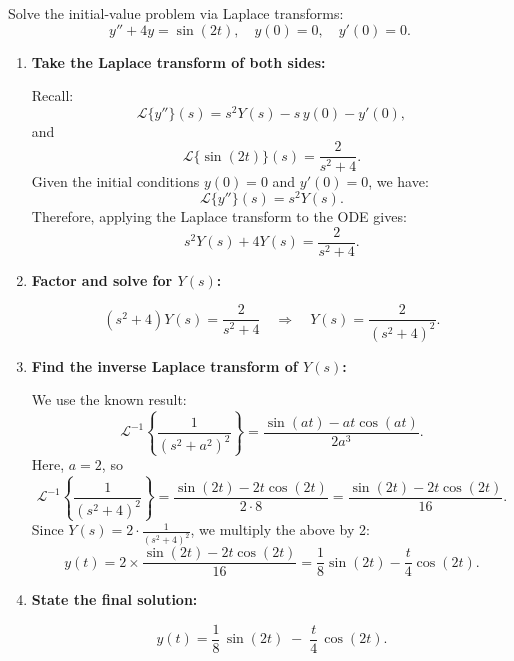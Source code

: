 \exampleline
\begin{example}
Solve the initial-value problem via Laplace transforms:
\[
y'' + 4y = \sin(2t), 
\quad y(0) = 0, 
\quad y'(0) = 0.
\]

\begin{solution}
\begin{enumerate}
\item \textbf{Take the Laplace transform of both sides:}

   Recall:
   \[
   \mathcal{L}\{y''\}(s) 
   = s^2Y(s) - s\,y(0) - y'(0), 
   \]
   and
   \[
   \mathcal{L}\{\sin(2t)\}(s) 
   = \frac{2}{s^2 + 4}.
   \]
   Given the initial conditions $y(0) = 0$ and $y'(0) = 0$, we have:
   \[
   \mathcal{L}\{y''\}(s) = s^2 Y(s).
   \]
   Therefore, applying the Laplace transform to the ODE gives:
   \[
   s^2 Y(s) + 4Y(s) 
   = \frac{2}{s^2 + 4}.
   \]

\item \textbf{Factor and solve for $Y(s)$:}

   \[
   (s^2 + 4)Y(s) 
   = \frac{2}{s^2 + 4} 
   \quad \Longrightarrow \quad
   Y(s) = \frac{2}{(s^2 + 4)^2}.
   \]

\item \textbf{Find the inverse Laplace transform of $Y(s)$:}

   We use the known result:
   \[
   \mathcal{L}^{-1}\left\{
      \frac{1}{(s^2 + a^2)^2}
   \right\}
   = \frac{\sin(at) - at\cos(at)}{2a^3}.
   \]
   Here, $a=2$, so
   \[
   \mathcal{L}^{-1}\left\{
      \frac{1}{(s^2 + 4)^2}
   \right\}
   = \frac{\sin(2t) - 2t\cos(2t)}{2\cdot 8}
   = \frac{\sin(2t) - 2t\cos(2t)}{16}.
   \]
   Since $Y(s) = 2 \cdot \frac{1}{(s^2 + 4)^2}$, we multiply the above by 2:
   \[
   y(t) = 2 \times
   \frac{\sin(2t) - 2t\cos(2t)}{16}
   = \frac{1}{8}\sin(2t) - \frac{t}{4}\cos(2t).
   \]

\item \textbf{State the final solution:}

   \[
   y(t) = \frac{1}{8}\,\sin(2t)
   \;-\; \frac{t}{4}\,\cos(2t).
   \]

\end{enumerate}
\end{solution}
\end{example}
\exampleline
